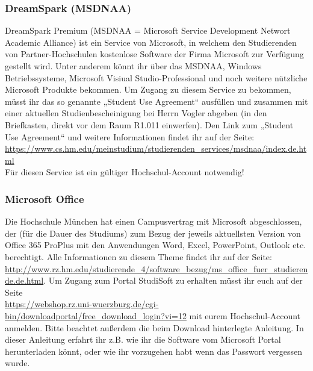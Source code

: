\subsubsection{DreamSpark (MSDNAA)}
DreamSpark Premium (MSDNAA = Microsoft Service Development 
Networt Academic Alliance) ist ein Service von Microsoft, in welchem 
den Studierenden von Partner-Hochschulen kostenlose Software der 
Firma Microsoft zur Verfügung gestellt wird. \doublebreak
Unter anderem könnt ihr über das MSDNAA, Windows Betriebssysteme, 
Microsoft Visiual Studio-Professional und noch weitere nützliche Microsoft Produkte bekommen. \doublebreak
Um Zugang zu diesem Service zu bekommen, müsst ihr das so genannte 
„Student Use Agreement“ ausfüllen und zusammen mit einer aktuellen 
Studienbescheinigung bei Herrn Vogler abgeben (in den Briefkasten, 
direkt vor dem Raum R1.011 einwerfen). \doublebreak
Den Link zum „Student Use Agreement“ und weitere Informationen 
findet ihr auf der Seite: \url{https://www.cs.hm.edu/meinstudium/studierenden_services/msdnaa/index.de.html}\\
Für diesen Service ist ein gültiger Hochschul-Account notwendig!

\subsubsection{Microsoft Office}
Die Hochschule München hat einen Campusvertrag mit Microsoft abgeschlossen, der (für die Dauer des Studiums) zum Bezug der jeweils aktuellsten Version von Office 365 ProPlus mit den Anwendungen Word, Excel, PowerPoint, Outlook etc. berechtigt. Alle Informationen zu diesem Theme findet ihr auf der Seite: \url{http://www.rz.hm.edu/studierende_4/software_bezug/ms_office_fuer_studierende.de.html}.\doublebreak
Um Zugang zum Portal StudiSoft zu erhalten müsst ihr euch auf der Seite\\ \url{https://webshop.rz.uni-wuerzburg.de/cgi-bin/downloadportal/free_download_login?vi=12} mit eurem Hochschul-Account anmelden. Bitte beachtet außerdem die beim Download hinterlegte Anleitung. In dieser Anleitung erfahrt ihr z.B. wie ihr die Software vom Microsoft Portal herunterladen könnt, oder wie ihr vorzugehen habt wenn das Passwort vergessen wurde.